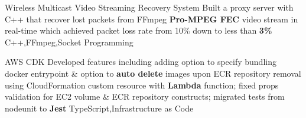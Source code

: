 \begin{projects}
  \project
  {Wireless Multicast Video Streaming Recovery System}{}
  {}
  {Built a proxy server with C++ that recover lost packets from FFmpeg \textbf{Pro-MPEG FEC} video stream in real-time which achieved packet loss rate from 10\% down to less than \textbf{3\%}}
  {C++,FFmpeg,Socket Programming}

  \project
  {AWS CDK}{}
  {}
  {Developed features including adding option to specify bundling docker entrypoint \& option to \textbf{auto delete} images upon ECR repository removal using CloudFormation custom resource with \textbf{Lambda} function; fixed props validation for EC2 volume \& ECR repository constructs; migrated tests from nodeunit to \textbf{Jest}}
  {TypeScript,Infrastructure as Code}

\end{projects}
